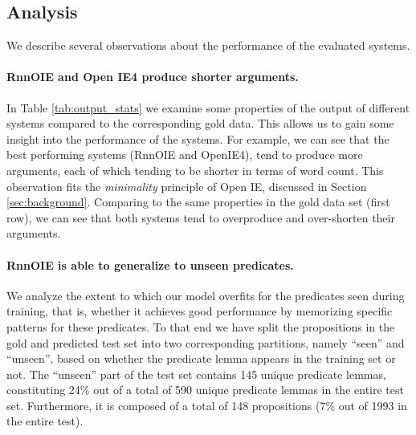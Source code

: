 

\subsection{Analysis}
We describe several observations about the performance of the evaluated systems.

\paragraph{RnnOIE and Open IE4 produce shorter arguments.}
In Table \ref{tab:output_stats} we examine some properties of the output of different systems compared to the corresponding gold data.
This allows us to gain some insight into the performance of the systems.
For example, we can see that the best performing systems (RnnOIE and OpenIE4), tend to produce
more arguments, each of which tending to be shorter in terms of word count.
This observation fits the \emph{minimality} principle of Open IE, discussed in Section \ref{sec:background}.
Comparing to the same properties in the gold data set (first row), we can see that both systems
tend to overproduce and over-shorten their arguments.

\paragraph{RnnOIE is able to generalize to unseen predicates.}
We analyze the extent to which our model overfits for the predicates seen during training, that is, whether it achieves good performance by memorizing specific patterns for these predicates.
To that end we have split the propositions in the gold and predicted test set into two corresponding partitions, namely ``seen'' and ``unseen'',
based on whether the predicate lemma appears in the training set or not.
The ``unseen'' part of the test set contains 145 unique predicate lemmas, constituting
24\% out of a total of 590 unique predicate lemmas in the entire test set.
Furthermore, it is composed of a total of 148 propositions (7\% out of 1993 in the entire test).


